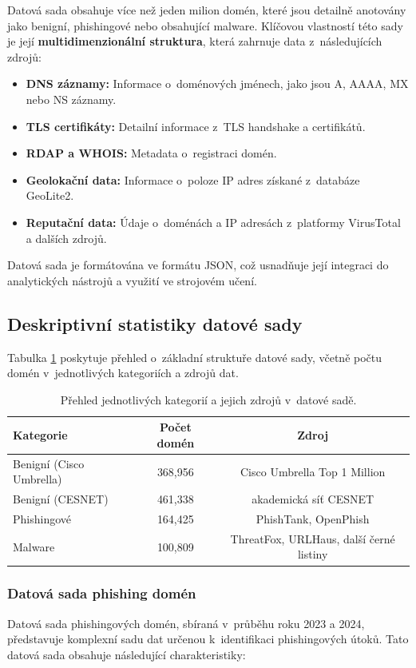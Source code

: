 Datová sada obsahuje více než jeden milion domén, které jsou detailně anotovány jako benigní, phishingové nebo obsahující malware. Klíčovou vlastností této sady je její \textbf{multidimenzionální struktura}, která zahrnuje data z~následujících zdrojů:
\begin{itemize}
    \item \textbf{DNS záznamy:} Informace o~doménových jménech, jako jsou A, AAAA, MX nebo NS záznamy.
    \item \textbf{TLS certifikáty:} Detailní informace z~TLS handshake a certifikátů.
    \item \textbf{RDAP a WHOIS:} Metadata o~registraci domén.
    \item \textbf{Geolokační data:} Informace o~poloze IP adres získané z~databáze GeoLite2.
    \item \textbf{Reputační data:} Údaje o~doménách a IP adresách z~platformy VirusTotal a dalších zdrojů.
\end{itemize}
Datová sada je formátována ve formátu JSON, což usnadňuje její integraci do analytických nástrojů a využití ve strojovém učení.

\subsection{Deskriptivní statistiky datové sady}

Tabulka \ref{tab:dataset_summary} poskytuje přehled o~základní struktuře datové sady, včetně počtu domén v~jednotlivých kategoriích a zdrojů dat.

\begin{table}[h!]
\centering
\begin{tabular}{|l|c|c|}
\hline
\textbf{Kategorie} & \textbf{Počet domén} & \textbf{Zdroj} \\
\hline
Benigní (Cisco Umbrella) & 368,956 & Cisco Umbrella Top 1 Million \\
\hline
Benigní (CESNET) & 461,338 & akademická síť  CESNET \\
\hline
Phishingové & 164,425 & PhishTank, OpenPhish \\
\hline
Malware & 100,809 & ThreatFox, URLHaus, další černé listiny \\
\hline
\end{tabular}
\caption{Přehled jednotlivých kategorií a jejich zdrojů v~datové sadě.}
\label{tab:dataset_summary}
\end{table}


\subsubsection{Datová sada phishing domén}
Datová sada phishingových domén, sbíraná v~průběhu roku 2023 a 2024, představuje komplexní sadu dat určenou k~identifikaci phishingových útoků. Tato datová sada obsahuje následující charakteristiky:


